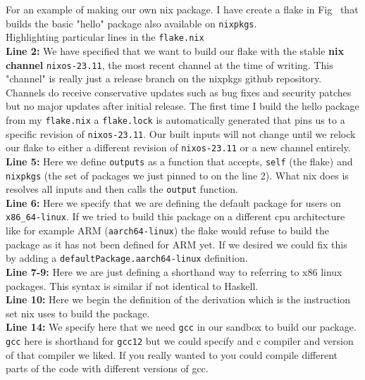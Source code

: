 For an example of making our own nix package. I have create a flake in Fig~ that builds the basic "hello" package also available on \texttt{nixpkgs}. \\

Highlighting particular lines in the \texttt{flake.nix} \\

\textbf{Line 2:} We have specified that we want to build our flake with the stable \textbf{nix channel} \texttt{nixos-23.11}, the most recent channel at the time of writing. This "channel" is really just a release branch on the nixpkgs github repository. Channels do receive conservative updates such as bug fixes and security patches but no major updates after initial release. The first time I build the hello package from my \texttt{flake.nix} a \texttt{flake.lock} is automatically generated that pins us to a specific revision of \texttt{nixos-23.11}. Our built inputs will not change until we relock our flake to either a different revision of \texttt{nixos-23.11} or a new channel entirely. \\

\textbf{Line 5:} Here we define \texttt{outputs} as a function that accepts, \texttt{self} (the flake) and \texttt{nixpkgs} (the set of packages we just pinned to on the line 2). What nix does is resolves all inputs and then calls the \texttt{output} function.\\

\textbf{Line 6:} Here we specify that we are defining the default package for users on \texttt{x86\_64-linux}. If we tried to build this package on a different cpu architecture like for example ARM (\texttt{aarch64-linux}) the flake would refuse to build the package  as it has not been defined for ARM yet. If we desired we could fix this by adding a \texttt{defaultPackage.aarch64-linux} definition.\\

\textbf{Line 7-9:} Here we are just defining a shorthand way to referring to x86 linux packages. This syntax is similar if not identical to Haskell.\\

\textbf{Line 10:} Here we begin the definition of the derivation which is the instruction set nix uses to build the package.\\

\textbf{Line 14:} We specify here that we need \texttt{gcc} in our sandbox to build our package. \texttt{gcc} here is shorthand for \texttt{gcc12} but we could specify and c compiler and version of that compiler we liked. If you really wanted to you could compile different parts of the code with different versions of gcc.\\


